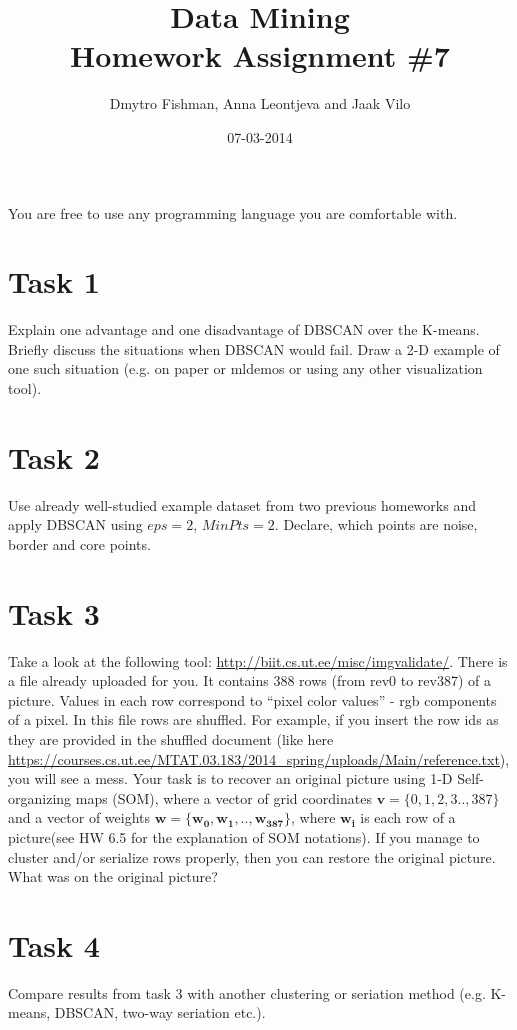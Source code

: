 \documentclass{article}
\title{Data Mining\\Homework Assignment \#7} %
\author{Dmytro Fishman, Anna Leontjeva and Jaak Vilo} %
\date{07-03-2014} %
\begin{document}
\maketitle %

You are free to use any programming language you are comfortable with. 

\section*{Task 1}
Explain one advantage and one disadvantage of DBSCAN over the K-means. Briefly discuss the situations when DBSCAN would fail. Draw a 2-D example of one such situation (e.g. on paper or mldemos or using any other visualization tool).
\section*{Task 2}
Use already well-studied example dataset from two previous homeworks and apply DBSCAN using $eps=2$, $MinPts=2$. Declare, which points are noise, border and core points. 

\section*{Task 3}
Take a look at the following tool: \url{http://biit.cs.ut.ee/misc/imgvalidate/}. There is a file already uploaded for you. It contains 388 rows (from rev0 to rev387) of a picture. Values in each row correspond to ``pixel color values'' - rgb components of a pixel. In this file rows are shuffled. For example, if you insert the row ids as they are provided in the shuffled document (like here \url{https://courses.cs.ut.ee/MTAT.03.183/2014_spring/uploads/Main/reference.txt}), you will see a mess. Your task is to recover an original picture using 1-D Self-organizing maps (SOM), where a vector of grid coordinates $\mathbf{v} = \{0,1,2,3..,387\}$ and a vector of weights $\mathbf{w} = \{\boldsymbol{w_0,w_1,..,w_{387}}\}$, 
where $\boldsymbol{w_i}$ is each row of a picture(see HW 6.5 for the explanation of SOM notations).
If you manage to cluster and/or serialize rows properly, then you can restore the original picture. What was on the original picture?

\section*{Task 4}
Compare results from task 3 with another clustering or seriation method (e.g. K-means, DBSCAN, two-way seriation etc.).
\end{document}
